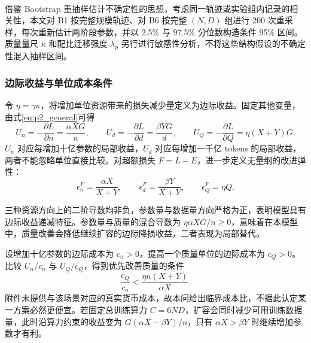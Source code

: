 \documentclass[bwprint]{gmcmthesis}
\begin{document}
        借鉴 Bootstrap 重抽样估计不确定性的思想\textsuperscript{\cite{efron1979bootstrap}}，考虑同一轨迹或实验组内记录的相关性，本文对 B1 按完整规模轨迹、对 B6 按完整 $(N,D)$ 组进行 200 次重采样，每次重新估计两阶段参数，并以 2.5\% 与 97.5\% 分位数构造条件 95\% 区间。质量量尺 $\kappa$ 和配比迁移强度 $\lambda_p$ 另行进行敏感性分析，不将这些结构假设的不确定性混入抽样区间。
    
        \subsubsection{边际收益与单位成本条件}  %
        令 $\eta=\gamma\kappa$，将增加单位资源带来的损失减少量定义为边际收益。固定其他变量，由式\eqref{eq:p2_general}可得
        \begin{equation}
         U_n=-\frac{\partial L}{\partial n}=\frac{\alpha XG}{n},\qquad
         U_d=-\frac{\partial L}{\partial d}=\frac{\beta YG}{d},\qquad
         U_Q=-\frac{\partial L}{\partial Q}=\eta(X+Y)G.
         \label{eq:p2_marginal}
        \end{equation}
        $U_n$ 对应每增加十亿参数的局部收益，$U_d$ 对应每增加一千亿 tokens 的局部收益，两者不能忽略单位直接比较。对超额损失 $F=L-E$，进一步定义无量纲的改进弹性：
        \begin{equation}
         \epsilon_n^F=\frac{\alpha X}{X+Y},\qquad
         \epsilon_d^F=\frac{\beta Y}{X+Y},\qquad
         \epsilon_Q^F=\eta Q.
         \label{eq:p2_elasticity}
        \end{equation}
        
        
        三种资源方向上的二阶导数均非负，参数量与数据量方向严格为正，表明模型具有边际收益递减特征。参数量与质量的混合导数为 $\eta\alpha XG/n\geq0$，意味着在本模型中，质量改善会降低继续扩容的边际降损收益，二者表现为局部替代。
        
        设增加十亿参数的边际成本为 $c_n>0$，提高一个质量单位的边际成本为 $c_Q>0$。比较 $U_n/c_n$ 与 $U_Q/c_Q$，得到优先改善质量的条件
        \begin{equation}
         \frac{c_Q}{c_n}<\frac{\eta n(X+Y)}{\alpha X}.
         \label{eq:p2_cost}
        \end{equation}
        附件未提供与该场景对应的真实货币成本，故本问给出临界成本比，不据此认定某一方案必然更便宜。若固定总训练算力 $C=6ND$，扩容会同时减少可用训练数据量，此时沿算力约束的收益变为 $G(\alpha X-\beta Y)/n$，只有 $\alpha X>\beta Y$ 时继续增加参数才有利。
    
\end{document}

